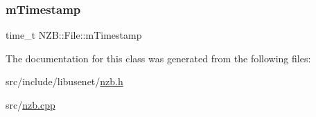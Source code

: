 \subsubsection{\texorpdfstring{m\+Timestamp}{mTimestamp}}
{\footnotesize\ttfamily time\+\_\+t N\+Z\+B\+::\+File\+::m\+Timestamp\hspace{0.3cm}{\ttfamily [protected]}}



The documentation for this class was generated from the following files\+:\begin{DoxyCompactItemize}
\item 
src/include/libusenet/\hyperlink{nzb_8h}{nzb.\+h}\item 
src/\hyperlink{nzb_8cpp}{nzb.\+cpp}\end{DoxyCompactItemize}
